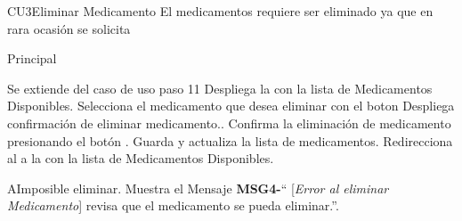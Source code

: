 \begin{UseCase}{CU3}{Eliminar Medicamento}{
		El medicamentos requiere ser eliminado ya que en rara ocasión se solicita
	}
	\end{UseCase}
	\begin{UCtrayectoria}{Principal}

		\UCpaso Se extiende del caso de uso  paso 11
		\UCpaso Despliega la  con la lista de Medicamentos Disponibles.
		\UCpaso[\UCactor]Selecciona el medicamento que desea eliminar con el boton
		\UCpaso Despliega confirmación de eliminar medicamento..
		\UCpaso [\UCactor] Confirma la eliminación de medicamento presionando el botón .
		\UCpaso Guarda y actualiza la lista de medicamentos.
		\UCpaso Redirecciona al \UCactor a la   con la lista de Medicamentos Disponibles.
	\end{UCtrayectoria}

		\begin{UCtrayectoriaA}{A}{Imposible eliminar.}
			\UCpaso Muestra el Mensaje {\bf MSG4-}`` [{\em Error al eliminar Medicamento}] revisa que el medicamento se pueda eliminar.''.

		\end{UCtrayectoriaA}


